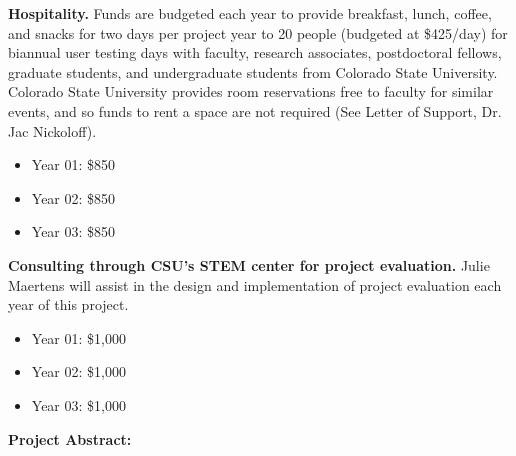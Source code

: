 \documentclass[pdftex,english,11pt,parskip=half]{scrartcl}
\begin{document}
\noindent \textbf{Hospitality.} Funds are budgeted each year to provide breakfast, lunch, coffee, and snacks for two days per project year to 20 people (budgeted at \$425/day) for biannual user testing days with faculty, research associates, postdoctoral fellows, graduate students, and undergraduate students from Colorado State University. Colorado State University provides room reservations free to faculty for similar events, and so funds to rent a space are not required (See Letter of Support, Dr. Jac Nickoloff).
\begin{itemize}
\item Year 01: \$850
\item Year 02: \$850
\item Year 03: \$850
\end{itemize}

\noindent \textbf{Consulting through CSU's STEM center for project evaluation.} Julie Maertens will assist in the design and implementation of project evaluation each year of this project.
\begin{itemize}
\item Year 01: \$1,000
\item Year 02: \$1,000
\item Year 03: \$1,000
\end{itemize}

\newpage

{\large \textbf{Project Abstract:}}
\end{document}
